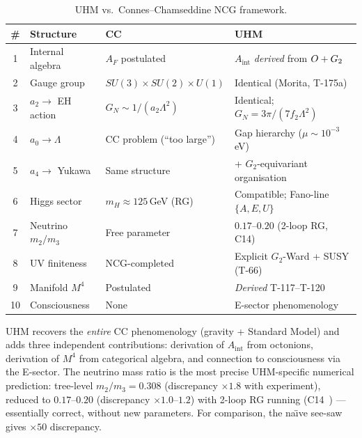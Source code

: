 \begin{table}[H]
\centering\small
\caption{UHM vs.\ Connes--Chamseddine NCG framework.}
\label{tab:cc-comparison}
\begin{tabular}{@{}clll@{}}
\toprule
\# & \textbf{Structure} & \textbf{CC} & \textbf{UHM} \\
\midrule
1 & Internal algebra   & $A_F$ postulated & $A_\mathrm{int}$ \emph{derived} from $O + G_2$ \\
2 & Gauge group        & $SU(3){\times}SU(2){\times}U(1)$ & Identical (Morita, T-175a) \\
3 & $a_2 \to$ EH action & $G_N \sim 1/(a_2\Lambda^2)$ & Identical; $G_N = 3\pi/(7f_2\Lambda^2)$ \\
4 & $a_0 \to \Lambda$   & CC problem (``too large'') & Gap hierarchy ($\mu\sim 10^{-3}$\,eV) \\
5 & $a_4 \to$ Yukawa     & Same structure & + $G_2$-equivariant organisation \\
6 & Higgs sector       & $m_H \approx 125$\,GeV (RG) & Compatible; Fano-line $\{A,E,U\}$ \\
7 & Neutrino $m_2/m_3$ & Free parameter & $0.17$--$0.20$ (2-loop RG, C14) \\
8 & UV finiteness      & NCG-completed & Explicit $G_2$-Ward + SUSY (T-66) \\
9 & Manifold $M^4$     & Postulated & \emph{Derived} T-117--T-120 \\
10 & Consciousness      & None & E-sector phenomenology \\
\bottomrule
\end{tabular}
\end{table}

\noindent
UHM recovers the \emph{entire} CC phenomenology (gravity + Standard Model) and adds three
independent contributions: derivation of $A_\mathrm{int}$ from octonions, derivation of
$M^4$ from categorical algebra, and connection to consciousness via the E-sector. The
neutrino mass ratio is the most precise UHM-specific numerical prediction: tree-level
$m_2/m_3 = 0.308$ (discrepancy $\times 1.8$ with experiment), reduced to $0.17$--$0.20$
(discrepancy $\times 1.0$--$1.2$) with 2-loop RG running (C14~) --- essentially
correct, without new parameters. For comparison, the na\"{\i}ve see-saw gives $\times 50$
discrepancy.
